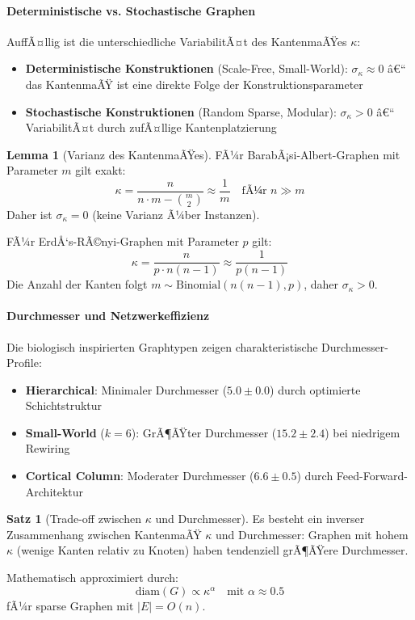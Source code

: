 ﻿\documentclass[a4paper,12pt]{article}
\theoremstyle{definition}
\newtheorem{satz}{Satz}
\newtheorem{lemma}{Lemma}
\begin{document}
	\paragraph{Deterministische vs. Stochastische Graphen}
	
	AuffÃ¤llig ist die unterschiedliche VariabilitÃ¤t des KantenmaÃŸes $\kappa$:
	
	\begin{itemize}
		\item[-] \textbf{Deterministische Konstruktionen} (Scale-Free, Small-World): $\sigma_\kappa \approx 0$ â€“ das KantenmaÃŸ ist eine direkte Folge der Konstruktionsparameter
		\item[-] \textbf{Stochastische Konstruktionen} (Random Sparse, Modular): $\sigma_\kappa > 0$ â€“ VariabilitÃ¤t durch zufÃ¤llige Kantenplatzierung
	\end{itemize}
	
	\begin{lemma}[Varianz des KantenmaÃŸes]
		FÃ¼r BarabÃ¡si-Albert-Graphen mit Parameter $m$ gilt exakt:
		\[
		\kappa = \frac{n}{n \cdot m - \binom{m}{2}} \approx \frac{1}{m} \quad \text{fÃ¼r } n \gg m
		\]
		Daher ist $\sigma_\kappa = 0$ (keine Varianz Ã¼ber Instanzen).
		
		FÃ¼r ErdÅ‘s-RÃ©nyi-Graphen mit Parameter $p$ gilt:
		\[
		\kappa = \frac{n}{p \cdot n(n-1)} \approx \frac{1}{p(n-1)}
		\]
		Die Anzahl der Kanten folgt $m \sim \text{Binomial}(n(n-1), p)$, daher $\sigma_\kappa > 0$.
	\end{lemma}
	
	\paragraph{Durchmesser und Netzwerkeffizienz}
	
	Die biologisch inspirierten Graphtypen zeigen charakteristische Durchmesser-Profile:
	
	\begin{itemize}
		\item[-] \textbf{Hierarchical}: Minimaler Durchmesser ($5.0 \pm 0.0$) durch optimierte Schichtstruktur
		\item[-] \textbf{Small-World} ($k=6$): GrÃ¶ÃŸter Durchmesser ($15.2 \pm 2.4$) bei niedrigem Rewiring
		\item[-] \textbf{Cortical Column}: Moderater Durchmesser ($6.6 \pm 0.5$) durch Feed-Forward-Architek\-tur
	\end{itemize}
	
	\begin{satz}[Trade-off zwischen $\kappa$ und Durchmesser]
		Es besteht ein inverser Zusammenhang zwischen KantenmaÃŸ $\kappa$ und Durchmesser: Graphen mit hohem $\kappa$ (wenige Kanten relativ zu Knoten) haben tendenziell grÃ¶ÃŸere Durchmesser.
		
		Mathematisch approximiert durch:
		\[
		\text{diam}(G) \propto \kappa^\alpha \quad \text{mit } \alpha \approx 0.5
		\]
		fÃ¼r sparse Graphen mit $|E| = O(n)$.
	\end{satz}
	
\end{document}
